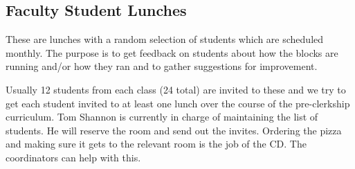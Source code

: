 \documentclass[11pt]{article}
\begin{document}
\subsection*{Faculty Student Lunches}

These are lunches with a random selection of students which are scheduled monthly.  The purpose is to get feedback on students about how the blocks are running and/or how they ran and to gather suggestions for improvement.

Usually 12 students from each class (24 total) are invited to these and we try to get each student invited to at least one lunch over the course of the pre-clerkship curriculum.  Tom Shannon is currently in charge of maintaining the list of students.  He will reserve the room and send out the invites.  Ordering the pizza and making sure it gets to the relevant room is the job of the CD.  The coordinators can help with this.
\end{document}
